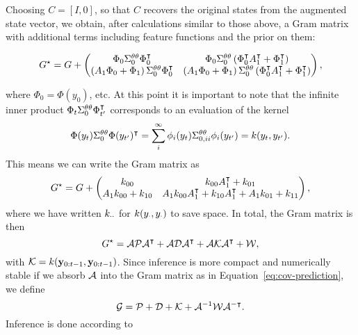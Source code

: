 Choosing $C=[I, 0]$, so that $C$ recovers the original states from the augmented
state vector, we obtain, after calculations similar to those above, a Gram
matrix with additional terms including feature functions and the prior on them:
\begin{fullwidth}\vspace{-\baselineskip}
\begin{equation}
  G^\star = G + \begin{pmatrix}
  \Phi_0 \Sigma^{\theta\theta}_0 \Phi_0^{\intercal}&
  \Phi_0 \Sigma^{\theta\theta}_0 \left(\Phi_0^{\intercal} A_1^{\intercal} + \Phi_1^{\intercal}\right)\\
  \left(A_1 \Phi_0 + \Phi_1 \right) \Sigma^{\theta\theta}_0 \Phi_0^{\intercal} &
  \left(A_1 \Phi_0 + \Phi_1 \right) \Sigma^{\theta\theta}_0 \left(\Phi_0^{\intercal} A_1^{\intercal} +
\Phi_1^{\intercal}\right)
\end{pmatrix},
\end{equation}
\end{fullwidth}
where $\Phi_0 = \Phi(y_0)$, etc. At this point it is important to note that the
infinite inner product $\Phi_t \Sigma^{\theta\theta}_0 \Phi_{t'}^{\intercal}$ corresponds to
an evaluation of the kernel
\begin{equation}
  \Phi(y_t) \Sigma^{\theta\theta}_0 \Phi(y_{t'})^{\intercal} = \sum_i^\infty \phi_i(y_t)
  \Sigma^{\theta\theta}_{0,ii}  \phi_i(y_{t'}) = k(y_t,y_{t'}).
\end{equation}
This means we can write the Gram matrix as
\begin{equation}
  G^\star = G + \begin{pmatrix}
  k_{00} &
  k_{00} A_1^{\intercal} + k_{01}\\
  A_1 k_{00} + k_{10} &
  A_1 k_{00} A_1 ^{\intercal} + k_{10} A_1^{\intercal} + A_1
  k_{01} + k_{11}
\end{pmatrix},
\end{equation}
where we have written $k_{\cdot\cdot}$ for $k(y_\cdot,y_\cdot)$ to save
space. In total, the Gram matrix is then
\begin{equation}
  G^{\star} = \mathcal{A}\mathcal{P}\mathcal{A}^{\intercal} + \mathcal{A}\mathcal{D}\mathcal{A}^{\intercal} + \mathcal{A}\mathcal{K}\mathcal{A}^{\intercal} + \mathcal{W},
\end{equation}
with $\mathcal{K} = k(\mathbf{y}_{0:t-1},\mathbf{y}_{0:t-1})$. Since inference is
more
compact and numerically stable if we absorb $\mathcal{A}$ into the Gram matrix as in
Equation~\eqref{eq:cov-prediction}, we define
\begin{equation}
  \mathcal{G} = \mathcal{P} + \mathcal{D} + \mathcal{K} + \mathcal{A}^{-1}\mathcal{W}\mathcal{A}^{-\intercal}.
\end{equation}
Inference is done according to
